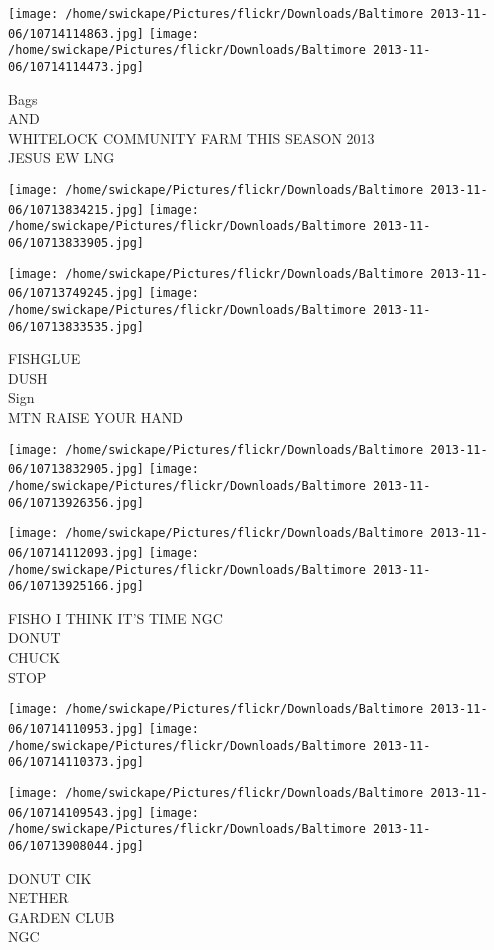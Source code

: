 \documentclass[10pt,letterpaper]{article}
\begin{document}
\texttt{[image: /home/swickape/Pictures/flickr/Downloads/Baltimore 2013-11-06/10714114863.jpg]}
\texttt{[image: /home/swickape/Pictures/flickr/Downloads/Baltimore 2013-11-06/10714114473.jpg]}

Bags\\
AND\\
WHITELOCK COMMUNITY FARM THIS SEASON 2013\\
JESUS EW LNG
\pagebreak

\texttt{[image: /home/swickape/Pictures/flickr/Downloads/Baltimore 2013-11-06/10713834215.jpg]}
\texttt{[image: /home/swickape/Pictures/flickr/Downloads/Baltimore 2013-11-06/10713833905.jpg]}

\texttt{[image: /home/swickape/Pictures/flickr/Downloads/Baltimore 2013-11-06/10713749245.jpg]}
\texttt{[image: /home/swickape/Pictures/flickr/Downloads/Baltimore 2013-11-06/10713833535.jpg]}

FISHGLUE\\
DUSH\\
Sign\\
MTN RAISE YOUR HAND
\pagebreak

\texttt{[image: /home/swickape/Pictures/flickr/Downloads/Baltimore 2013-11-06/10713832905.jpg]}
\texttt{[image: /home/swickape/Pictures/flickr/Downloads/Baltimore 2013-11-06/10713926356.jpg]}

\texttt{[image: /home/swickape/Pictures/flickr/Downloads/Baltimore 2013-11-06/10714112093.jpg]}
\texttt{[image: /home/swickape/Pictures/flickr/Downloads/Baltimore 2013-11-06/10713925166.jpg]}

FISHO I THINK IT'S TIME NGC\\
DONUT\\
CHUCK\\
STOP
\pagebreak

\texttt{[image: /home/swickape/Pictures/flickr/Downloads/Baltimore 2013-11-06/10714110953.jpg]}
\texttt{[image: /home/swickape/Pictures/flickr/Downloads/Baltimore 2013-11-06/10714110373.jpg]}

\texttt{[image: /home/swickape/Pictures/flickr/Downloads/Baltimore 2013-11-06/10714109543.jpg]}
\texttt{[image: /home/swickape/Pictures/flickr/Downloads/Baltimore 2013-11-06/10713908044.jpg]}

DONUT CIK\\
NETHER\\
GARDEN CLUB\\
NGC
\pagebreak
\end{document}
